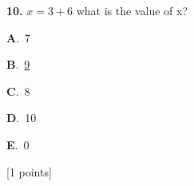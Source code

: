 \documentclass[12pt]{article}
\newcommand{\choice}[3]{%
  \noindent\textbf{#1}.~#2\hfill#3\par\vspace{0.25em}
}
\begin{document}
\noindent \textbf{\textenglish{10.}} \(x=3+6 \){\textenglish{ what is the value of x?}}

\noindent\choice{A}{{\textenglish{7}}}{}
\noindent\choice{B}{\underline{{\textenglish{9}}}}{}
\noindent\choice{C}{{\textenglish{8}}}{}
\noindent\choice{D}{{\textenglish{10}}}{}
\noindent\choice{E}{{\textenglish{0}}}{}
\hfill {\textenglish{[1 points]}}\\[0.5em]
\end{document}
